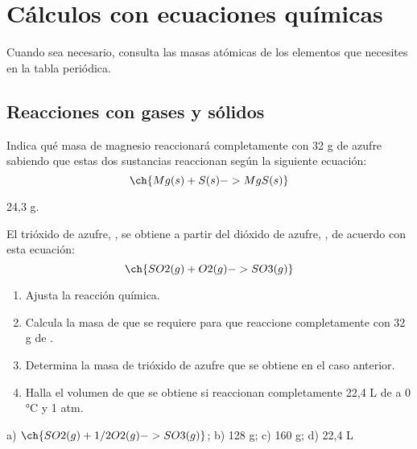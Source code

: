 \documentclass[
]{article}
\author{}
\date{}
\providecommand{\tightlist}{%
  \setlength{\itemsep}{0pt}\setlength{\parskip}{0pt}}
\begin{document}
\hypertarget{cuxe1lculos-con-ecuaciones-quuxedmicas}{%
\section{Cálculos con ecuaciones
químicas}\label{cuxe1lculos-con-ecuaciones-quuxedmicas}}

Cuando sea necesario, consulta las masas atómicas de los elementos que
necesites en la tabla periódica.

\hypertarget{reacciones-con-gases-y-suxf3lidos}{%
\subsection{Reacciones con gases y
sólidos}\label{reacciones-con-gases-y-suxf3lidos}}

\begin{exercise}[tags=OXF16] Indica qué masa de magnesio reaccionará
completamente con 32 g de azufre sabiendo que estas dos sustancias
reaccionan según la siguiente ecuación:
\[\ch{Mg(s) + S(s) -> MgS(s)}\]\end{exercise}

\begin{solution}24,3 g.\end{solution}

\begin{exercise}[tags=OXF16] El trióxido de azufre, , se obtiene
a partir del dióxido de azufre, , de acuerdo con esta ecuación:
\[\ch{SO2(g) + O2(g) -> SO3(g)}\]

\begin{enumerate}
\def\labelenumi{\alph{enumi})}
\tightlist
\item
  Ajusta la reacción química.
\item
  Calcula la masa de  que se requiere para que reaccione
  completamente con 32 g de .
\item
  Determina la masa de trióxido de azufre que se obtiene en el caso
  anterior.
\item
  Halla el volumen de  que se obtiene si reaccionan
  completamente 22,4 L de  a 0 °C y 1 atm.
\end{enumerate}

\end{exercise}

\begin{solution}a) \(\ch{SO2(g) + 1/2 O2(g) -> SO3(g)}\); b) 128 g; c)
160 g; d) 22,4 L\end{solution}
\end{document}
